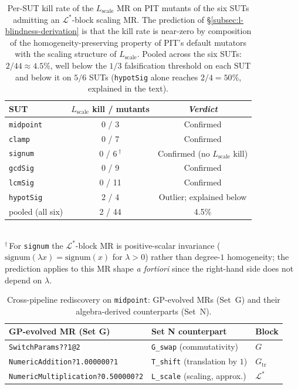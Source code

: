 \documentclass[manuscript]{acmart}
\begin{document}
\begin{table}[h]
\centering
\caption{Per-SUT kill rate of the $L_{\mathrm{scale}}$ MR on PIT
mutants of the six SUTs admitting an $\mathcal{L}^{*}$-block scaling
MR. The prediction of \S\ref{subsec:l-blindness-derivation} is that
the kill rate is near-zero by composition of the
homogeneity-preserving property of PIT's default mutators with the
scaling structure of $L_{\mathrm{scale}}$. Pooled across the six SUTs:
$2/44 \approx 4.5\%$, well below the $1/3$ falsification threshold on
each SUT and below it on $5/6$ SUTs (\texttt{hypotSig} alone reaches
$2/4 = 50\%$, explained in the text).}
\label{tab:l-blindness}
\small
\begin{tabular}{lcc}
\toprule
SUT & $L_{\mathrm{scale}}$ kill / mutants & \emph{Verdict} \\
\midrule
\texttt{midpoint}  &  0 / 3   & Confirmed \\
\texttt{clamp}     &  0 / 7   & Confirmed \\
\texttt{signum}    &  0 / 6\,$^{\dagger}$ & Confirmed (no $L_{\mathrm{scale}}$ kill) \\
\texttt{gcdSig}    &  0 / 9   & Confirmed \\
\texttt{lcmSig}    &  0 / 11  & Confirmed \\
\texttt{hypotSig}  &  2 / 4   & Outlier; explained below \\
\midrule
pooled (all six)   &  2 / 44   & 4.5\% \\
\bottomrule
\end{tabular}\\[0.4em]
{\footnotesize $^{\dagger}$\,For \texttt{signum} the $\mathcal{L}^{*}$-block MR
is positive-scalar invariance ($\mathrm{signum}(\lambda x) = \mathrm{signum}(x)$
for $\lambda > 0$) rather than degree-$1$ homogeneity; the prediction
applies to this MR shape \emph{a fortiori} since the right-hand side
does not depend on $\lambda$.}
\end{table}

\begin{table}[h]
\centering
\caption{Cross-pipeline rediscovery on \texttt{midpoint}: GP-evolved
MRs (Set~G) and their algebra-derived counterparts (Set~N).}
\label{tab:rediscovery}
\small
\begin{tabular}{lll}
\toprule
GP-evolved MR (Set G) & Set N counterpart & Block \\
\midrule
\texttt{SwitchParams??1@2}                & \texttt{G\_swap} (commutativity)         & $G$ \\
\texttt{NumericAddition?1.000000?1}       & \texttt{T\_shift} (translation by $1$)   & $G_{\mathrm{tr}}$ \\
\texttt{NumericMultiplication?0.500000?2} & \texttt{L\_scale} (scaling, approx.)     & $\mathcal{L}^{*}$ \\
\bottomrule
\end{tabular}
\end{table}
\end{document}
